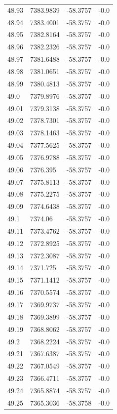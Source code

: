 \begin{table}[H]
\begin{tabular}{llll}
48.93 & 7383.9839 & -58.3757 & -0.0 \\
48.94 & 7383.4001 & -58.3757 & -0.0 \\
48.95 & 7382.8164 & -58.3757 & -0.0 \\
48.96 & 7382.2326 & -58.3757 & -0.0 \\
48.97 & 7381.6488 & -58.3757 & -0.0 \\
48.98 & 7381.0651 & -58.3757 & -0.0 \\
48.99 & 7380.4813 & -58.3757 & -0.0 \\
49.0 & 7379.8976 & -58.3757 & -0.0 \\
49.01 & 7379.3138 & -58.3757 & -0.0 \\
49.02 & 7378.7301 & -58.3757 & -0.0 \\
49.03 & 7378.1463 & -58.3757 & -0.0 \\
49.04 & 7377.5625 & -58.3757 & -0.0 \\
49.05 & 7376.9788 & -58.3757 & -0.0 \\
49.06 & 7376.395 & -58.3757 & -0.0 \\
49.07 & 7375.8113 & -58.3757 & -0.0 \\
49.08 & 7375.2275 & -58.3757 & -0.0 \\
49.09 & 7374.6438 & -58.3757 & -0.0 \\
49.1 & 7374.06 & -58.3757 & -0.0 \\
49.11 & 7373.4762 & -58.3757 & -0.0 \\
49.12 & 7372.8925 & -58.3757 & -0.0 \\
49.13 & 7372.3087 & -58.3757 & -0.0 \\
49.14 & 7371.725 & -58.3757 & -0.0 \\
49.15 & 7371.1412 & -58.3757 & -0.0 \\
49.16 & 7370.5574 & -58.3757 & -0.0 \\
49.17 & 7369.9737 & -58.3757 & -0.0 \\
49.18 & 7369.3899 & -58.3757 & -0.0 \\
49.19 & 7368.8062 & -58.3757 & -0.0 \\
49.2 & 7368.2224 & -58.3757 & -0.0 \\
49.21 & 7367.6387 & -58.3757 & -0.0 \\
49.22 & 7367.0549 & -58.3757 & -0.0 \\
49.23 & 7366.4711 & -58.3757 & -0.0 \\
49.24 & 7365.8874 & -58.3757 & -0.0 \\
49.25 & 7365.3036 & -58.3758 & -0.0 \\

\end{tabular}
\end{table}
